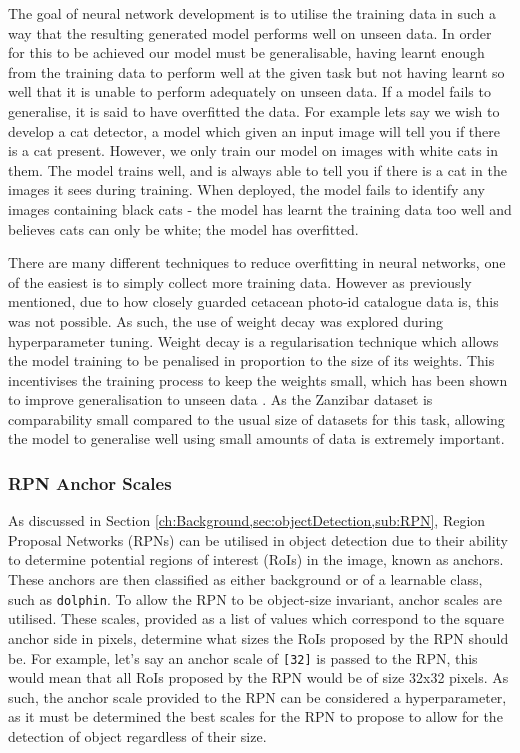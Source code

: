 The goal of neural network development is to utilise the training data in such a way that the resulting generated model performs well on unseen data. In order for this to be achieved our model must be generalisable, having learnt enough from the training data to perform well at the given task but not having learnt so well that it is unable to perform adequately on unseen data. If a model fails to generalise, it is said to have overfitted the data. For example lets say we wish to develop a cat detector, a model which given an input image will tell you if there is a cat present. However, we only train our model on images with white cats in them. The model trains well, and is always able to tell you if there is a cat in the images it sees during training. When deployed, the model fails to identify any images containing black cats - the model has learnt the training data too well and believes cats can only be white; the model has overfitted. 

There are many different techniques to reduce overfitting in neural networks, one of the easiest is to simply collect more training data. However as previously mentioned, due to how closely guarded cetacean photo-id catalogue data is, this was not possible. As such, the use of weight decay was explored during hyperparameter tuning. Weight decay is a regularisation technique which allows the model training to be penalised in proportion to the size of its weights. This incentivises the training process to keep the weights small, which has been shown to improve generalisation to unseen data \cite{krogh_simple_1991}. As the Zanzibar dataset is comparability small compared to the usual size of datasets for this task, allowing the model to generalise well using small amounts of data is extremely important.

\subsubsection{RPN Anchor Scales}\label{ch:cetDet,sec:initialTesting,sub:hyperparameters,subsub:RPNAnchorScales}

As discussed in Section \ref{ch:Background,sec:objectDetection,sub:RPN}, Region Proposal Networks (RPNs) can be utilised in object detection due to their ability to determine potential regions of interest (RoIs) in the image, known as anchors. These anchors are then classified as either background or of a learnable class, such as \texttt{dolphin}. To allow the RPN to be object-size invariant, anchor scales are utilised. These scales, provided as a list of values which correspond to the square anchor side in pixels, determine what sizes the RoIs proposed by the RPN should be. For example, let's say an anchor scale of \texttt{[32]} is passed to the RPN, this would mean that all RoIs proposed by the RPN would be of size 32x32 pixels. As such, the anchor scale provided to the RPN can be considered a hyperparameter, as it must be determined the best scales for the RPN to propose to allow for the detection of object regardless of their size. 

